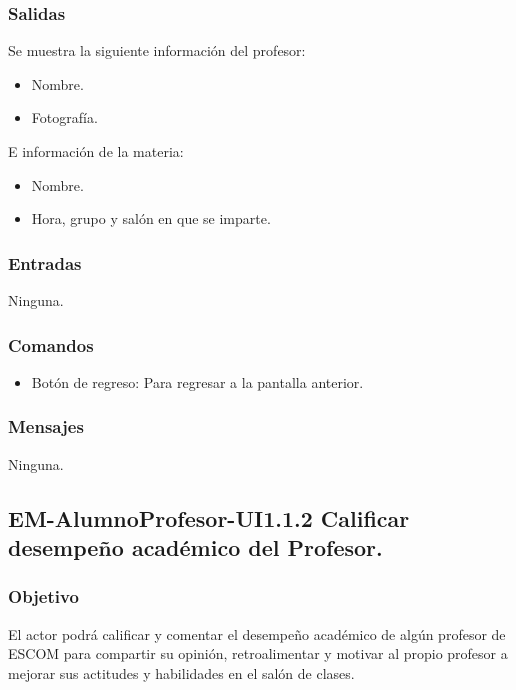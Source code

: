 \pagebreak
{}

\subsubsection{Salidas}
	\noindent
	Se muestra la siguiente información del profesor:
	\begin{itemize}
		\item Nombre.
		\item Fotografía. 
	\end{itemize}
	E información de la materia:
	\begin{itemize}
		\item Nombre.
		\item Hora, grupo y salón en que se imparte. 
	\end{itemize}

\subsubsection{Entradas}
	\noindent
	Ninguna.

\subsubsection{Comandos}
\begin{itemize}
	\item Botón de regreso: Para regresar a la pantalla anterior.
\end{itemize}

\subsubsection{Mensajes}
	\noindent
	Ninguna.


\newpage

\subsection{EM-AlumnoProfesor-UI1.1.2 Calificar desempeño académico del Profesor.}

\subsubsection{Objetivo}
	\noindent
	El actor podrá calificar y comentar el desempeño académico de algún profesor de ESCOM para compartir su opinión, retroalimentar y motivar al propio profesor a mejorar sus actitudes y habilidades en el salón de clases.

